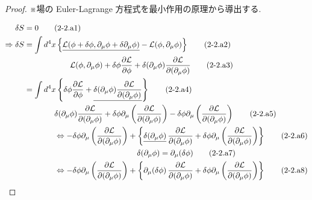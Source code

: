 \documentclass[a4paper,12pt]{article}
\begin{document}
\color{blue}

\begin{proof}
※場の Euler-Lagrange 方程式を最小作用の原理から導出する.

\begin{align*}
    \delta S &= 0 \tag{2-2.a1} \\
    \Rightarrow \delta S &= \int d^4x \left\{ \underline{\mathcal{L}(\phi + \delta \phi, \partial_\mu \phi + \delta \partial_\mu \phi)} - \mathcal{L}(\phi, \partial_\mu \phi) \right\} \tag{2-2.a2} \\
    &\quad \hspace{1.7cm} \mathcal{L}(\phi, \partial_\mu \phi) 
    + \delta \phi \frac{\partial \mathcal{L}}{\partial \phi} 
    + \delta (\partial_\mu \phi) \frac{\partial \mathcal{L}}{\partial (\partial_\mu \phi)} \tag{2-2.a3} \\
    &= \int d^4x \left\{ 
    \delta \phi \frac{\partial \mathcal{L}}{\partial \phi} 
    + \underline{\delta (\partial_\mu \phi) \frac{\partial \mathcal{L}}{\partial (\partial_\mu \phi)}} 
    \right\} \tag{2-2.a4} \\
    &\quad \hspace{1cm} \delta(\partial_\mu \phi)\frac{\partial \mathcal{L}}{\partial(\partial_\mu \phi)}+  \delta \phi \partial_\mu \left( \frac{\partial \mathcal{L}}{\partial (\partial_\mu \phi)} \right) - \delta \phi \partial_\mu \left( \frac{\partial \mathcal{L}}{\partial (\partial_\mu \phi)} \right) \tag{2-2.a5} \\
    &\quad \hspace{1cm} \Leftrightarrow - \delta \phi \partial_\mu \left( \frac{\partial \mathcal{L}}{\partial (\partial_\mu \phi)} \right) + \left\{ \underline{\delta(\partial_\mu \phi)}\, \frac{\partial \mathcal{L}}{\partial(\partial_\mu \phi)} + \delta \phi \partial_\mu \left( \frac{\partial \mathcal{L}}{\partial (\partial_\mu \phi)} \right) \right\} \tag{2-2.a6} \\
    & \quad \hspace{4.7cm} \delta (\partial_\mu \phi) = \partial_\mu (\delta \phi) \tag{2-2.a7} \\
    & \quad \hspace{1cm} \Leftrightarrow - \delta \phi \partial_\mu \left( \frac{\partial \mathcal{L}}{\partial (\partial_\mu \phi)} \right) + \left\{ \partial_\mu(\delta \phi)\, \frac{\partial \mathcal{L}}{\partial(\partial_\mu \phi)} + \delta \phi \partial_\mu \left( \frac{\partial \mathcal{L}}{\partial (\partial_\mu \phi)} \right) \right\} \tag{2-2.a8} \\

\end{align*}
\end{proof}
\end{document}

